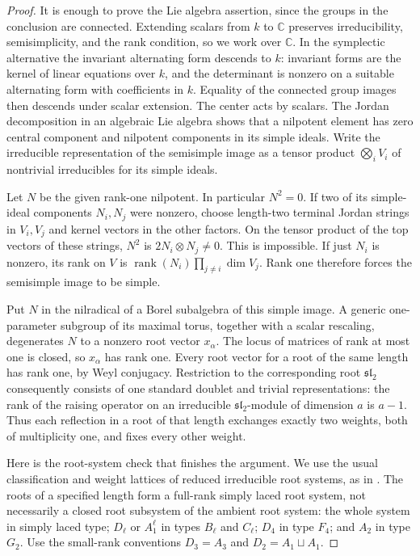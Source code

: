 \documentclass[11pt]{article}
\newcommand{\C}{\mathbb C}
\theoremstyle{plain}
\theoremstyle{definition}
\theoremstyle{remark}
\numberwithin{equation}{section}
\begin{document}
\begin{proof}
It is enough to prove the Lie algebra assertion, since the groups in the
conclusion are connected.  Extending scalars from $k$ to $\C$ preserves
irreducibility, semisimplicity, and the rank condition, so we work over
$\C$.  In the symplectic alternative the invariant alternating form
descends to $k$: invariant forms are the kernel of linear equations
over $k$, and the determinant is nonzero on a suitable alternating
form with coefficients in $k$.  Equality of the connected group images then descends under
scalar extension.  The center
acts by scalars.  The Jordan decomposition in an algebraic Lie algebra
shows that a nilpotent element has zero central component and nilpotent
components in its simple ideals.  Write the irreducible representation
of the semisimple image as a tensor product $\bigotimes_i V_i$ of
nontrivial irreducibles for its simple ideals.

Let $N$ be the given rank-one nilpotent.  In particular $N^2=0$.  If two
of its simple-ideal components $N_i,N_j$ were nonzero, choose length-two
terminal Jordan strings in $V_i,V_j$ and kernel vectors in the other
factors.  On the tensor product of the top vectors of these strings,
$N^2$ is $2N_i\otimes N_j\ne0$.  This is impossible.  If just $N_i$ is
nonzero, its rank on $V$ is
$\operatorname{rank}(N_i)\prod_{j\ne i}\dim V_j$.  Rank one therefore forces the
semisimple image to be simple.

Put $N$ in the nilradical of a Borel subalgebra of this simple image.
A generic one-parameter subgroup of its maximal torus, together with
a scalar rescaling, degenerates $N$ to a nonzero root vector $x_\alpha$.
The locus of matrices of rank at most one is closed, so $x_\alpha$ has
rank one.  Every root vector for a root of the same length has rank one,
by Weyl conjugacy.  Restriction to the corresponding root
$\mathfrak{sl}_2$ consequently consists of one standard doublet and
trivial representations: the rank of the raising operator on an
irreducible $\mathfrak{sl}_2$-module of dimension $a$ is $a-1$.
Thus each reflection in a root of that length exchanges exactly two
weights, both of multiplicity one, and fixes every other weight.

Here is the root-system check that finishes the argument.  We use the
usual classification and weight lattices of reduced irreducible root
systems, as in \cite[Sections~23--25 and~30]{Etingof2024Lie}.  The roots
of a specified length form a full-rank simply laced root system, not
necessarily a closed root subsystem of the ambient root system: the whole
system in simply laced type; $D_\ell$ or $A_1^\ell$ in types $B_\ell$
and $C_\ell$; $D_4$ in type $F_4$; and $A_2$ in type $G_2$.  Use the
small-rank conventions $D_3=A_3$ and $D_2=A_1\sqcup A_1$.


\end{proof}
\end{document}
